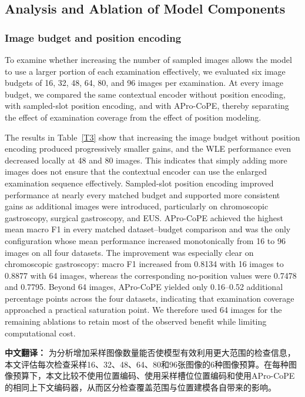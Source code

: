 \documentclass[Afour,sagev,times]{sagej}
\begin{document}
\subsection{Analysis and Ablation of Model Components}

\subsubsection{Image budget and position encoding}

To examine whether increasing the number of sampled images allows the model to use a larger portion of each examination effectively, we evaluated six image budgets of 16, 32, 48, 64, 80, and 96 images per examination. At every image budget, we compared the same contextual encoder without position encoding, with sampled-slot position encoding, and with APro-CoPE, thereby separating the effect of examination coverage from the effect of position modeling.

The results in Table~\ref{T3} show that increasing the image budget without position encoding produced progressively smaller gains, and the WLE performance even decreased locally at 48 and 80 images. This indicates that simply adding more images does not ensure that the contextual encoder can use the enlarged examination sequence effectively. Sampled-slot position encoding improved performance at nearly every matched budget and supported more consistent gains as additional images were introduced, particularly on chromoscopic gastroscopy, surgical gastroscopy, and EUS. APro-CoPE achieved the highest mean macro F1 in every matched dataset--budget comparison and was the only configuration whose mean performance increased monotonically from 16 to 96 images on all four datasets. The improvement was especially clear on chromoscopic gastroscopy: macro F1 increased from 0.8134 with 16 images to 0.8877 with 64 images, whereas the corresponding no-position values were 0.7478 and 0.7795. Beyond 64 images, APro-CoPE yielded only 0.16--0.52 additional percentage points across the four datasets, indicating that examination coverage approached a practical saturation point. We therefore used 64 images for the remaining ablations to retain most of the observed benefit while limiting computational cost.

\textbf{中文翻译：} 为分析增加采样图像数量能否使模型有效利用更大范围的检查信息，本文评估每次检查采样16、32、48、64、80和96张图像的6种图像预算。在每种图像预算下，本文比较不使用位置编码、使用采样槽位位置编码和使用APro-CoPE的相同上下文编码器，从而区分检查覆盖范围与位置建模各自带来的影响。
\end{document}
